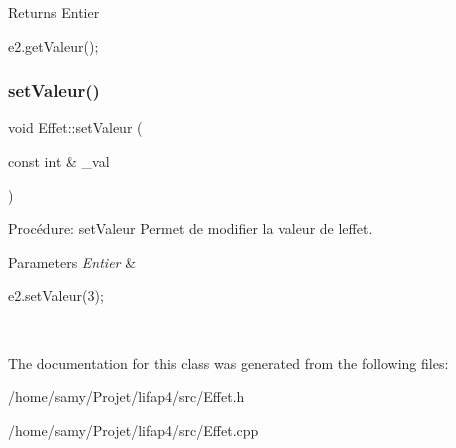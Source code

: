 \begin{DoxyReturn}{Returns}
Entier 
\begin{DoxyCode}
e2.getValeur();
\end{DoxyCode}
 
\end{DoxyReturn}
\mbox{\label{classEffet_a3d22eeba4c86d9f45e75d64e639d4e37}} 
\subsubsection{\texorpdfstring{set\+Valeur()}{setValeur()}}
{\footnotesize\ttfamily void Effet\+::set\+Valeur (\begin{DoxyParamCaption}\item[{const int \&}]{\+\_\+val }\end{DoxyParamCaption})}



Procédure\+: set\+Valeur Permet de modifier la valeur de l\textquotesingle{}effet. 


\begin{DoxyParams}{Parameters}
{\em Entier} & 
\begin{DoxyCode}
e2.setValeur(3);
\end{DoxyCode}
 \\
\hline
\end{DoxyParams}


The documentation for this class was generated from the following files\+:\begin{DoxyCompactItemize}
\item 
/home/samy/\+Projet/lifap4/src/Effet.\+h\item 
/home/samy/\+Projet/lifap4/src/Effet.\+cpp\end{DoxyCompactItemize}
